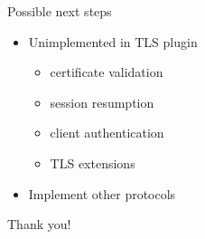 \begin{frame}{Possible next steps}

	\begin{itemize}
		\item Unimplemented in TLS plugin
			\begin{itemize}
			\item certificate validation
			\item session resumption
			\item client authentication
			\item TLS extensions
			\end{itemize}
		\item Implement other protocols
	\end{itemize}

\end{frame}

\begin{frame}[c]{}
\begin{center}
\LARGE Thank you!
\end{center}
\end{frame}


